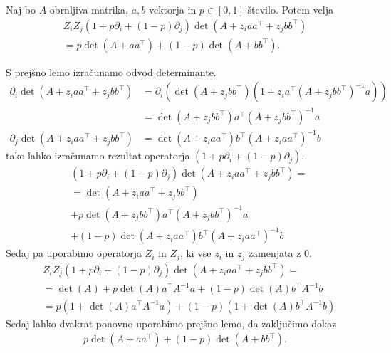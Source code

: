 \begin{lema}
    Naj bo \(A\) obrnljiva matrika, \(a,b\) vektorja in \(p\in [0,1]\) število. Potem velja
    \begin{align*}
        Z_iZ_j(1+p\partial_i + (1-p)\partial_j)\det(A + z_i aa^\top+ z_j bb^\top) \\
        = p\det(A + aa^\top) + (1-p)\det(A+bb^\top).
    \end{align*}
\end{lema}
\begin{dokaz}
    S prejšno lemo izračunamo odvod determinante.
    \begin{align*}
        \partial_i \det(A + z_i aa^\top +z_j bb^\top) &=\partial_i \left(\det(A + z_j bb^\top) (1+ z_i a^\top (A + z_j bb^\top)^{-1} a)\right)\\
        &= \det(A + z_j bb^\top) a^\top (A + z_j bb^\top)^{-1} a\\
        \partial_j \det(A + z_i aa^\top +z_j bb^\top) &= \det(A + z_i aa^\top) b^\top (A + z_i aa^\top)^{-1} b
    \end{align*}
    tako lahko izračunamo rezultat operatorja \((1+p\partial_i + (1-p)\partial_j)\).
    \begin{align*}
        &(1+p\partial_i + (1-p)\partial_j)\det(A + z_i aa^\top + z_j bb^\top) = \\
        &= \det(A + z_i aa^\top + z_j bb^\top) \\
        &+ p\det(A + z_j bb^\top) a^\top (A + z_j bb^\top)^{-1} a \\
        &+ (1-p)\det(A + z_i aa^\top) b^\top (A + z_i aa^\top)^{-1} b
    \end{align*}
    Sedaj pa uporabimo operatorja \(Z_i\) in \(Z_j\), ki vse \(z_i\) in \(z_j\) zamenjata z \(0\).
    \begin{align*}
        &Z_iZ_j(1+p\partial_i + (1-p)\partial_j)\det(A + z_i aa^\top+ z_j bb^\top) =\\
        &=\det(A) + p\det(A) a^\top A^{-1} a + (1-p)\det(A) b^\top A^{-1} b\\
        &= p(1+\det(A) a^\top A^{-1}a) + (1-p)(1+\det(A)b^\top A^{-1} b)
    \end{align*}
    Sedaj lahko dvakrat ponovno uporabimo prejšno lemo, da zaključimo dokaz
    \begin{align*}
        p \det(A + aa^\top) + (1-p)\det(A+bb^\top).
    \end{align*}
\end{dokaz}

